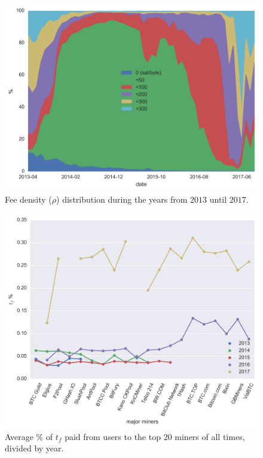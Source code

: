 \documentclass[USenglish]{uit-thesis}
\begin{document}
\begin{figure}[h]
	\centering
	\includegraphics[width=1\textwidth]{img/txs_feedensity_distribution}
	\caption{Fee density ($\rho$) distribution during the years from
		$2013$ until $2017$.}
	\label{fig:txs_feedensity_distribution}
\end{figure}

\begin{figure}[h]
	\centering
	\includegraphics[width=1\textwidth]{img/fee_input_miners}
	\caption{Average \% of $t_f$ paid from users to the top $20$ miners of all times, divided by year.}
	\label{fig:fee_input_miners}
\end{figure}
\end{document}

